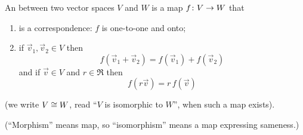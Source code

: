 \begin{definition}
\label{def:Isomorphism}
An %
between two vector spaces $V$ and $W$
is a map \( \mbox{$f\colon V\to W$} \) that
\begin{enumerate}
  \item is a correspondence:
     \( f \) is one-to-one and onto;\footnotemark %
  \item {}
   if \( \vec{v}_1,\vec{v}_2\in V \) then
   \begin{equation*}
      f(\vec{v}_1+\vec{v}_2)=f(\vec{v}_1)+f(\vec{v}_2)
   \end{equation*}
   and if \( \vec{v}\in V \) and \( r\in\Re \) then
   \begin{equation*}
         f(r\vec{v})=r\,f(\vec{v})
   \end{equation*}
\end{enumerate}
(we write \( V\cong W \), read ``\( V \) is isomorphic to \( W \)'',
when such a map exists).
\end{definition}

\noindent (``Morphism'' means map, 
so ``isomorphism'' means a map expressing sameness.)

